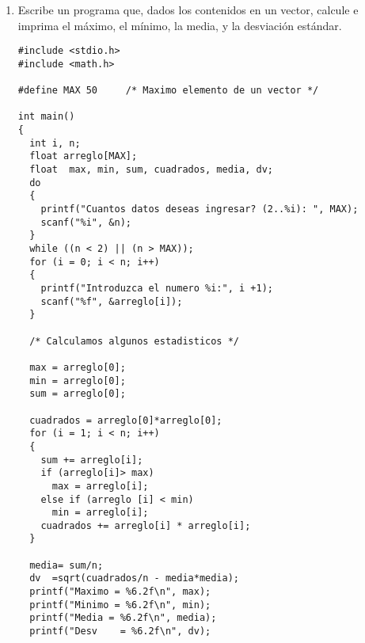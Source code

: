 \documentclass[twoside,10.5pt]{article}%
\begin{document}
\begin{enumerate}
\begin{verbatim}
int main()
{
    char *palabras[] = {"a","b","c","d","e",
                     "f","g","h","i","j", "k", "l", "m","n",
		    "o", "p", "q", "r", "s","t","u", "v", "w",
		    "x", "y", "z"};
    int s = sizeof(palabras)/sizeof(palabras[0]);
    per(palabras,s);
    muestraArreglo(palabras,s);
    return 0;
}

//Recorremos el arreglo y  en cada interacion generamos un numero aleatorio 
//entre  0 y i y  intercambiamos este con el numero  en la  posicion i.
void per(char *arreglo[], int s) {
    int i,r;
    srand(time(NULL)); 
    for (i = s-1; i >= 0; i--) {
        r = rand() % (i + 1);
        intercambio(i,r,arreglo);
    }
}

void intercambio(int i, int j, char *arreglo[]) {
    char *temp = arreglo[i];
    arreglo[i] = arreglo[j];
    arreglo[j] = temp;
}

void muestraArreglo(char *arreglo[], int s) {
    int i;
    for (i=0; i<s; i++) {
        printf("%s \n", arreglo[i]);
    }
}
 \end{verbatim}



\item  Escribe un programa que, dados los contenidos en un vector, calcule e imprima el m\'aximo, el m\'inimo, la media, y la desviaci\'on est\'andar.

\begin{verbatim}
#include <stdio.h>
#include <math.h>

#define MAX 50     /* Maximo elemento de un vector */

int main()
{
  int i, n;
  float arreglo[MAX];
  float  max, min, sum, cuadrados, media, dv;
  do
  {
    printf("Cuantos datos deseas ingresar? (2..%i): ", MAX);
    scanf("%i", &n);
  }
  while ((n < 2) || (n > MAX));
  for (i = 0; i < n; i++)
  {
    printf("Introduzca el numero %i:", i +1);
    scanf("%f", &arreglo[i]); 
  }
  
  /* Calculamos algunos estadisticos */
  
  max = arreglo[0];
  min = arreglo[0];
  sum = arreglo[0];
  
  cuadrados = arreglo[0]*arreglo[0];
  for (i = 1; i < n; i++)
  {
    sum += arreglo[i];
    if (arreglo[i]> max)
      max = arreglo[i];
    else if (arreglo [i] < min)
      min = arreglo[i];
    cuadrados += arreglo[i] * arreglo[i];
  }
  
  media= sum/n;
  dv  =sqrt(cuadrados/n - media*media);
  printf("Maximo = %6.2f\n", max);
  printf("Minimo = %6.2f\n", min);
  printf("Media = %6.2f\n", media);
  printf("Desv    = %6.2f\n", dv);
  

\end{verbatim}
\end{enumerate}
\end{document}
